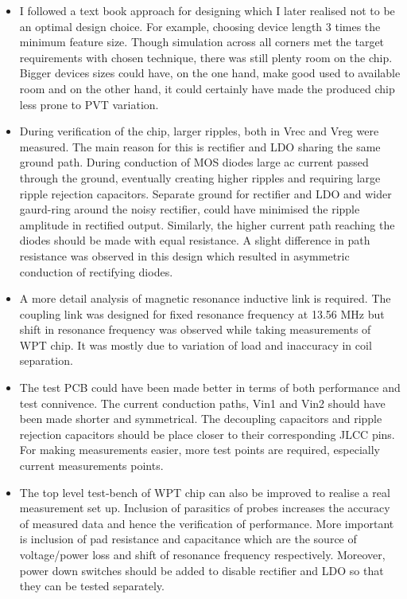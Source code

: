 \documentclass[12pt,a4paper,UKenglish]{report}
\begin{document}
\begin{itemize}
\item I followed a text book approach for designing which I later realised not to be an optimal design choice. For example, choosing device length 3 times the minimum feature size. Though simulation across all corners 
met the target requirements with chosen technique, there was still plenty room on the chip. Bigger devices sizes could have, on the one hand, make good used to available room and on the other hand, it could certainly have made the produced chip less prone to PVT variation. 
\item During verification  of the chip, larger ripples, both in Vrec and Vreg were measured. The main reason for this is rectifier and LDO sharing the same ground path. 
During conduction of MOS diodes large ac current passed through the ground, eventually creating higher ripples and requiring large ripple rejection capacitors. Separate ground for rectifier and LDO and wider gaurd-ring around the noisy rectifier, could have minimised the ripple amplitude in rectified output. Similarly, the higher current path reaching the diodes should be made with equal resistance. A slight difference in path resistance was observed in this design which resulted in asymmetric conduction of rectifying diodes. 
\item A more detail analysis of magnetic resonance inductive link is required. The coupling link was designed for fixed resonance frequency at 13.56 MHz but shift in resonance frequency was observed while taking measurements of WPT chip. It was 
mostly due to variation of load and inaccuracy in coil separation. %
\item The test PCB could have been made better in terms of both performance and test connivence. The current conduction paths, Vin1 and Vin2 should have been made shorter and symmetrical. The decoupling capacitors and ripple rejection capacitors should be place closer to their corresponding JLCC pins. For making measurements easier, more test points are required, especially current measurements points.
\item The top level test-bench of WPT chip can also be improved to realise a real measurement set up. Inclusion of parasitics of probes increases the accuracy of measured data and hence the verification of performance.  More important is inclusion of pad resistance and capacitance which are the source of voltage/power loss and shift of resonance frequency respectively. Moreover, power down switches should be added to disable rectifier and LDO so that they can be tested separately.
\end{itemize}
\end{document}
